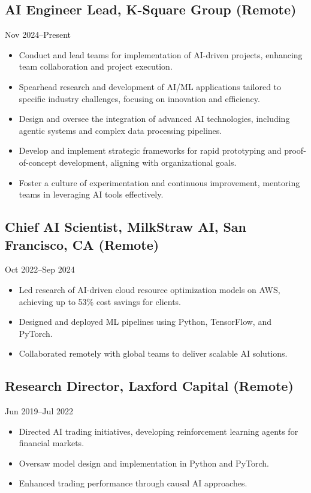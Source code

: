 \documentclass{article}
\begin{document}
\subsection{AI Engineer Lead, K-Square Group (Remote)}
Nov 2024--Present
\begin{itemize}
\item Conduct and lead teams for implementation of AI-driven projects, enhancing team collaboration and project execution.
\item Spearhead research and development of AI/ML applications tailored to specific industry challenges, focusing on innovation and efficiency.
\item Design and oversee the integration of advanced AI technologies, including agentic systems and complex data processing pipelines.
\item Develop and implement strategic frameworks for rapid prototyping and proof-of-concept development, aligning with organizational goals.
\item Foster a culture of experimentation and continuous improvement, mentoring teams in leveraging AI tools effectively.
\end{itemize}

\subsection{Chief AI Scientist, MilkStraw AI, San Francisco, CA (Remote)}
Oct 2022--Sep 2024
\begin{itemize}
\item Led research of AI-driven cloud resource optimization models on AWS, achieving up to 53\% cost savings for clients.
\item Designed and deployed ML pipelines using Python, TensorFlow, and PyTorch.
\item Collaborated remotely with global teams to deliver scalable AI solutions.
\end{itemize}

\subsection{Research Director, Laxford Capital (Remote)}
Jun 2019--Jul 2022
\begin{itemize}
\item Directed AI trading initiatives, developing reinforcement learning agents for financial markets.
\item Oversaw model design and implementation in Python and PyTorch.
\item Enhanced trading performance through causal AI approaches.
\end{itemize}
\end{document}
